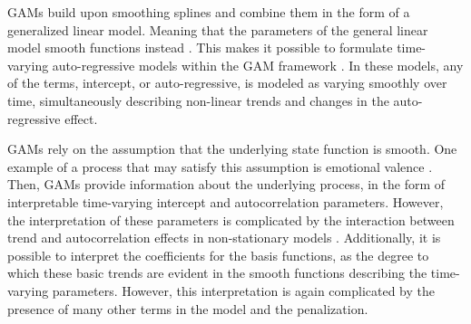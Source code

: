 GAMs build upon smoothing splines and combine them in the form of a generalized
linear model.
Meaning that the parameters of the general linear model smooth functions
instead
\parencite{wood_generalized_2006, hastie_generalized_1999}. This makes it
possible to formulate time-
varying auto-regressive models within the GAM framework
\parencite{bringmann_changing_2017,
    bringmann_modeling_2015}. In these models, any of the terms, intercept, or
auto-regressive,
is modeled as varying smoothly over time, simultaneously describing non-linear
trends and changes in the auto-regressive effect.

GAMs rely on the assumption that the underlying state function is smooth.
One example of a process that may satisfy this assumption is emotional valence
\parencite{bringmann_modeling_2015}. Then, GAMs provide information about
the underlying process, in the form of interpretable time-varying intercept and
autocorrelation
parameters. However, the interpretation of these parameters is complicated by
the interaction
between trend and autocorrelation effects in non-stationary models
\parencite{bauldry_nonlinear_2018, bollen_autoregressive_2004}.
Additionally, it is possible to interpret the coefficients for the basis
functions,
as the degree to which these basic trends are evident in the smooth functions
describing the
time-varying parameters. However, this interpretation is again complicated by
the presence
of many other terms in the model and the penalization.
